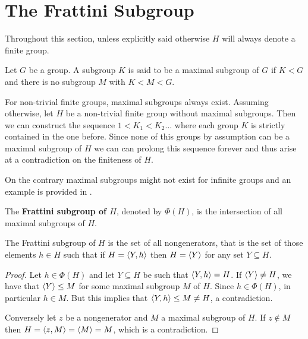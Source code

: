 \section{The Frattini Subgroup}

Throughout this section, unless explicitly said otherwise $H$ will always denote a finite group. 

\begin{definition}
    Let $G$ be a group. A subgroup $K$ is said to be a maximal subgroup of $G$ if $K < G$ and there is no subgroup $M$ with $K < M < G$.
\end{definition}

For non-trivial finite groups, maximal subgroups always exist. Assuming otherwise, let $H$ be a non-trivial finite group without maximal subgroups. Then we can construct the sequence
$1 < K_1 < K_2 \ldots $
where each group $K$ is strictly contained in the one before. Since none of this groups by assumption can be a maximal subgroup of $H$ we can can prolong this sequence forever and thus arise at a contradiction on the finiteness of $H$.

On the contrary maximal subgroups might not exist for infinite groups and an example is provided in \cite[p.~123]{RotmanITG}.

\begin{definition}
    The \textbf{Frattini subgroup of $H$}, denoted by \textbf{$\Phi(H)$}, is the intersection of all maximal subgroups of $H$. 
\end{definition}

\begin{theorem}
    \cite[p.~123]{RotmanITG}
    The Frattini subgroup of $H$ is the set of all nongenerators, that is the set of those elements $h \in H$ such that if $H = \langle Y, h \rangle$ then $H = \langle Y \rangle$ for any set $Y \subseteq H$.
\end{theorem}

\begin{proof}
    Let $h \in \Phi(H)$ and let $Y \subseteq H$ be such that $\langle Y, h \rangle = H$. If $\langle Y \rangle \ne H$, we have that $\langle Y \rangle \le M$ for some maximal subgroup $M$ of $H$. Since $h \in \Phi(H)$, in particular $h \in M$.  But this implies that $\langle Y,h \rangle \le M \ne H$, a contradiction.

    Conversely let $z$ be a nongenerator and $M$ a maximal subgroup of $H$. If $z \notin M$ then $H = \langle z, M \rangle = \langle M \rangle = M$, which is a contradiction.
\end{proof}

